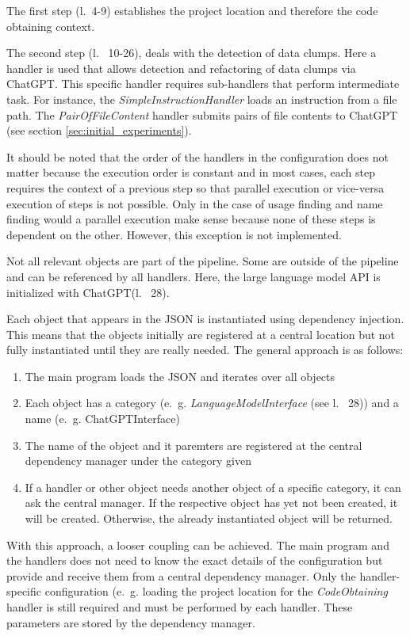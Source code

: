The first step (l.~4-9) establishes the project location and therefore the code obtaining context.

The second step (l.~ 10-26), deals with the detection of data clumps. Here a handler is used that allows detection and refactoring of data clumps via ChatGPT. This specific handler requires sub-handlers that perform intermediate task. For instance, the \textit{SimpleInstructionHandler} loads an instruction from a file path. The \textit{PairOfFileContent} handler submits pairs of file contents to ChatGPT (see section \ref{sec:initial_experiments}).

It should be noted that the order of the handlers in the configuration  does not matter because the execution order is constant and in most cases, each step requires the context of a previous step so that parallel execution or vice-versa execution of steps is not possible. Only in the case of usage finding and name finding would a parallel execution make sense because none of these steps is dependent on the other.  However, this exception is not implemented.

Not all relevant objects are part of the pipeline. Some are outside of the pipeline and can be referenced by all handlers. Here, the large language model \ac{API} is initialized with ChatGPT(l.~ 28).

Each object that appears in the \ac{JSON} is instantiated using dependency injection. This means that the objects initially are registered at a central location but not fully instantiated until they are really needed. The general approach is as follows:
\begin{enumerate}
    \item The main program loads the \ac{JSON} and iterates over all objects
    \item Each object has a category (e.~g. \textit{LanguageModelInterface} (see l.~ 28)) and a name (e.~g. ChatGPTInterface) 
    \item The name of the object and it paremters are registered at the central dependency manager under the category given
    \item If a handler or other object needs another object of a specific category, it can ask the central manager. If the respective object has  yet not been created, it will be created. Otherwise, the already instantiated object will be returned. 
\end{enumerate}
With this approach, a looser coupling can be achieved. The main program and the handlers does not need to know the exact details of the configuration but provide and receive them from a central dependency manager. Only the handler-specific configuration (e.~g. loading the project location  for the \textit{CodeObtaining} handler is still required and must be performed by each handler. These parameters are stored by the dependency manager. 
